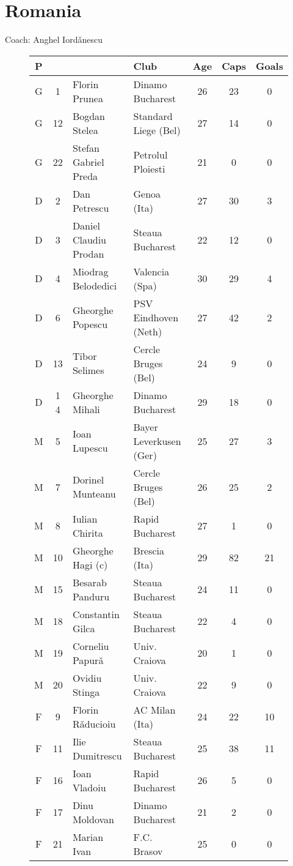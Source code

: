 \chapter{Romania}
\newline
\newline
Coach: Anghel Iord\v{a}nescu
\begin{figure}[H]
\begin{tabular}{c c l l c c c}
P & & & Club & Age & Caps & Goals \\ \hline
G & 1 & Florin Prunea & Dinamo Bucharest & 26 & 23 & 0 \\
G & 12 & Bogdan Stelea & Standard Liege (Bel) & 27 & 14 & 0 \\
G & 22 & Stefan Gabriel Preda & Petrolul Ploiesti & 21 & 0 & 0 \\ \hline
D & 2 & Dan Petrescu & Genoa (Ita) & 27 & 30 & 3 \\
D & 3 & Daniel Claudiu Prodan & Steaua Bucharest & 22 & 12 & 0 \\
D & 4 & Miodrag Belodedici & Valencia (Spa) & 30 & 29 & 4 \\
D & 6 & Gheorghe Popescu & PSV Eindhoven (Neth) & 27 & 42 & 2 \\
D & 13 & Tibor Selimes & Cercle Bruges (Bel) & 24 & 9 & 0 \\
D &1 4 & Gheorghe Mihali &  Dinamo Bucharest & 29 & 18 & 0 \\ \hline
M & 5 & Ioan Lupescu & Bayer Leverkusen (Ger) & 25 & 27 & 3 \\
M & 7 & Dorinel Munteanu & Cercle Bruges (Bel) & 26 & 25 & 2 \\
M & 8 & Iulian Chirita & Rapid Bucharest & 27 & 1 & 0 \\
M & 10 & Gheorghe Hagi (c) & Brescia (Ita) & 29 & 82 & 21 \\
M & 15 & Besarab Panduru &  Steaua Bucharest & 24 & 11 & 0 \\
M & 18 & Constantin Gilca & Steaua Bucharest & 22 & 4 & 0 \\
M & 19 & Corneliu Papur\v{a} & Univ. Craiova & 20 & 1 & 0 \\
M & 20 & Ovidiu Stinga & Univ. Craiova & 22 & 9 & 0 \\ \hline
F & 9 & Florin R\v{a}ducioiu & AC Milan (Ita) & 24 & 22 & 10 \\
F & 11 & Ilie Dumitrescu & Steaua Bucharest & 25 & 38 & 11 \\
F & 16 & Ioan Vladoiu & Rapid Bucharest & 26 & 5 & 0 \\
F & 17 & Dinu Moldovan & Dinamo Bucharest & 21 & 2 & 0 \\
F & 21 & Marian Ivan & F.C. Brasov & 25 & 0 & 0 \\ \hline
\end{tabular}
\end{figure}

